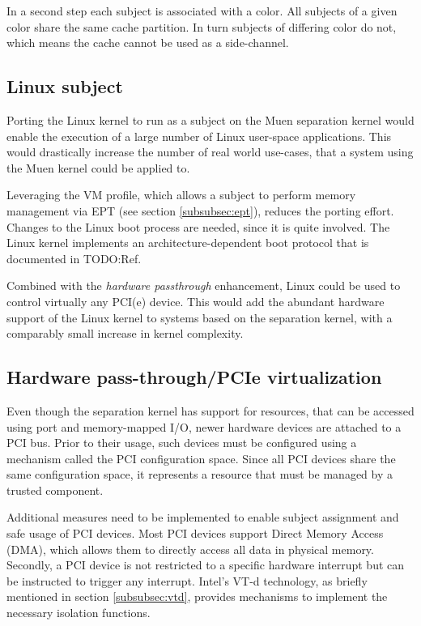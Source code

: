 In a second step each subject is associated with a color. All subjects of a
given color share the same cache partition. In turn subjects of differing color
do not, which means the cache cannot be used as a side-channel.

\subsection{Linux subject}
Porting the Linux kernel to run as a subject on the Muen separation kernel would
enable the execution of a large number of Linux user-space applications. This
would drastically increase the number of real world use-cases, that a system
using the Muen kernel could be applied to.

Leveraging the VM profile, which allows a subject to perform memory management
via EPT (see section \ref{subsubsec:ept}), reduces the porting effort. Changes
to the Linux boot process are needed, since it is quite involved. The Linux
kernel implements an architecture-dependent boot protocol that is documented in
TODO:Ref.

Combined with the \emph{hardware passthrough} enhancement, Linux could be used
to control virtually any PCI(e) device. This would add the abundant hardware
support of the Linux kernel to systems based on the separation kernel, with a
comparably small increase in kernel complexity.

\subsection{Hardware pass-through/PCIe virtualization}
Even though the separation kernel has support for resources, that can be
accessed using port and memory-mapped I/O, newer hardware devices are attached
to a PCI bus. Prior to their usage, such devices must be configured using a
mechanism called the PCI configuration space. Since all PCI devices share the
same configuration space, it represents a resource that must be managed by a
trusted component.

Additional measures need to be implemented to enable subject assignment and safe
usage of PCI devices. Most PCI devices support Direct Memory Access (DMA), which
allows them to directly access all data in physical memory. Secondly, a PCI
device is not restricted to a specific hardware interrupt but can be instructed
to trigger any interrupt. Intel's VT-d technology, as briefly mentioned in
section \ref{subsubsec:vtd}, provides mechanisms to implement the necessary
isolation functions.

